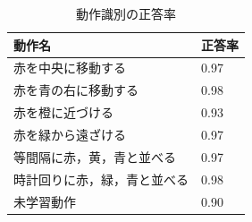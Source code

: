 \begin{table}[h]
	\caption{動作識別の正答率}
	\label{table:result}
	\centering
  	\begin{tabular}{|l|l|} \hline
    	動作名 & 正答率\\ \hline
   	赤を中央に移動する 		& 0.97
    	\\
    	赤を青の右に移動する 		& 0.98
    	\\
    	赤を橙に近づける 			& 0.93
    	\\
    	赤を緑から遠ざける 			& 0.97
    	\\
    	等間隔に赤，黄，青と並べる 	& 0.97
    	\\
    	時計回りに赤，緑，青と並べる 	& 0.98
    	\\
    	未学習動作				& 0.90
    	\\ \hline
  	\end{tabular}
\end{table}

